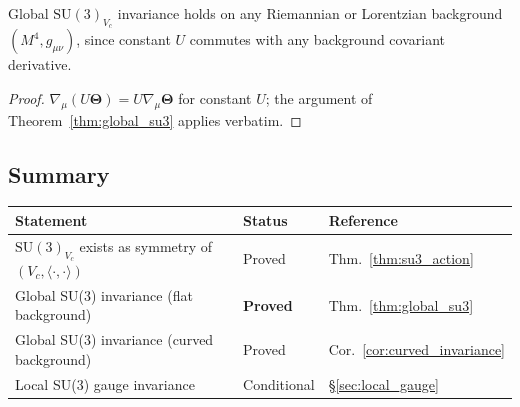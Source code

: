 \begin{corollary}
  \label{cor:curved_invariance}
  Global $\mathrm{SU}(3)_{V_c}$ invariance holds on any Riemannian or
  Lorentzian background $(M^4,g_{\mu\nu})$, since constant $U$ commutes
  with any background covariant derivative.
\end{corollary}

\begin{proof}
  $\nabla_\mu(U\boldsymbol{\Theta}) = U\nabla_\mu\boldsymbol{\Theta}$ for
  constant $U$; the argument of Theorem~\ref{thm:global_su3} applies verbatim.
\end{proof}

\subsection{Summary}

\begin{center}
\begin{tabular}{lll}
  \hline
  Statement & Status & Reference \\
  \hline
  $\mathrm{SU}(3)_{V_c}$ exists as symmetry of $(V_c,\langle\cdot,\cdot\rangle)$ & Proved & Thm.~\ref{thm:su3_action} \\
  Global SU(3) invariance (flat background) & \textbf{Proved} & Thm.~\ref{thm:global_su3} \\
  Global SU(3) invariance (curved background) & Proved & Cor.~\ref{cor:curved_invariance} \\
  Local SU(3) gauge invariance & Conditional & \S\ref{sec:local_gauge} \\
  \hline
\end{tabular}
\end{center}

